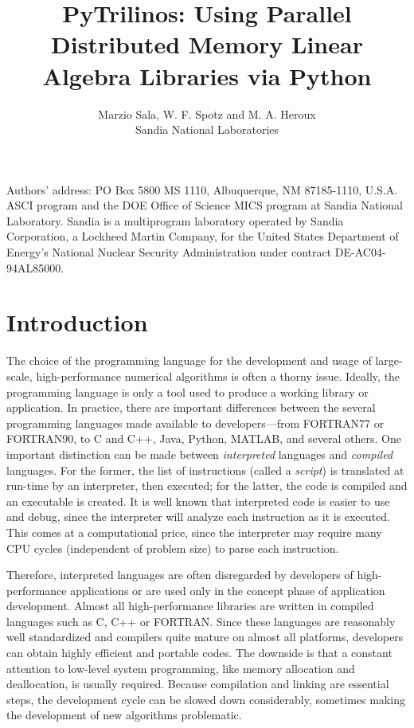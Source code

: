 \documentclass[acmtocl]{acmtrans2m}
\title{PyTrilinos: Using Parallel Distributed Memory Linear Algebra
  Libraries via Python}
\author{Marzio Sala, W. F. Spotz and M. A. Heroux\\Sandia National
  Laboratories}
\begin{document}
\setcounter{page}{1}

\begin{bottomstuff}
Authors' address:
PO Box 5800 MS 1110, Albuquerque, NM 87185-1110, U.S.A.\newline
ASCI program and the DOE Office of Science MICS program at Sandia
  National Laboratory.  Sandia is a multiprogram laboratory operated by
  Sandia Corporation, a Lockheed Martin Company, for the United States
  Department of Energy's National Nuclear Security Administration under
  contract DE-AC04-94AL85000.
\end{bottomstuff}

\maketitle

\section{Introduction}
\label{sec:intro}

The choice of the programming language for the development and usage
of large-scale, high-performance numerical algorithms is often a
thorny issue. Ideally, the programming language is only a tool used to
produce a working library or application. In practice, there are
important differences between the several programming languages made
available to developers---from FORTRAN77 or FORTRAN90, to C and C++,
Java, Python, MATLAB, and several others. One important distinction
can be made between {\sl interpreted} languages and {\sl compiled}
languages. For the former, the list of instructions (called a {\sl
  script}) is translated at run-time by an interpreter, then executed;
for the latter, the code is compiled and an executable is created.  It
is well known that interpreted code is easier to use and debug, since
the interpreter will analyze each instruction as it is executed. This
comes at a computational price, since the interpreter may require many
CPU cycles (independent of problem size) to parse each instruction.

Therefore, interpreted languages are often disregarded by developers
of high-performance applications or are used only in the concept phase
of application development. Almost all high-performance libraries are
written in compiled languages such as C, C++ or FORTRAN. Since these
languages are reasonably well standardized and compilers quite mature
on almost all platforms, developers can obtain highly efficient and
portable codes.  The downside is that a constant attention to
low-level system programming, like memory allocation and deallocation,
is usually required. Because compilation and linking are essential
steps, the development cycle can be slowed down considerably,
sometimes making the development of new algorithms problematic.
\end{document}
